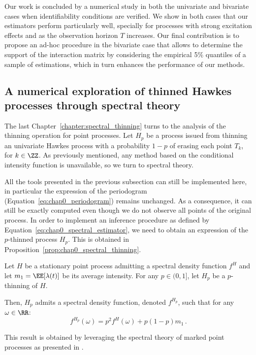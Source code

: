     Our work is concluded by a numerical study in both the univariate and bivariate cases when identifiability conditions are verified.
    We show in both cases that our estimators perform particularly well, specially for processes with strong excitation effects and as the observation horizon $T$ increases.
    Our final contribution is to propose an ad-hoc procedure in the bivariate case that allows to determine the support of the interaction matrix by considering the empirical 5$\%$ quantiles of a sample of estimations, which in turn enhances the performance of our methods.
    




    \subsection{A numerical exploration of thinned Hawkes processes through spectral theory}
    The last Chapter~\ref{chapter:spectral_thinning} turns to the analysis of the thinning operation for point processes.
    Let $H_p$ be a process issued from thinning an univariate Hawkes process with a probability $1-p$ of erasing each point $T_k$, for $k\in\ZZ$.
    As previously mentioned, any method based on the conditional intensity function is unavailable, so we turn to spectral theory.

    All the tools presented in the previous subsection can still be implemented here, in particular the expression of the periodogram (Equation~\eqref{eq:chap0_periodogram}) remains unchanged. 
    As a consequence, it can still be exactly computed even though we do not observe all points of the original process.
    In order to implement an inference procedure as defined by Equation~\eqref{eq:chap0_spectral_estimator}, we need to obtain an expression of the $p$-thinned process $H_p$.
    This is obtained in Proposition~\ref{prop:chap0_spectral_thinning}.

    \begin{proposition}\label{prop:chap0_spectral_thinning}
      Let $H$ be a stationary point process admitting a spectral density function $f^H$ and let $m_1=\EE[\lambda(t)]$ be its average intensity.
      For any $p\in(0,1]$, let $H_p$ be a $p$-thinning of $H$.
  
      Then, $H_p$ admits a spectral density function, denoted $f^{H_p}$, such that for any $\omega\in\RR$:
      \begin{equation}\label{eq:chap0_spectral_thinning}
          f^{H_p}(\omega) = p^2 f^H(\omega) + p(1-p)m_1\,.
      \end{equation}
  
  \end{proposition}
    This result is obtained by leveraging the spectral theory of marked point processes as presented in \textcite{Bremaud2005}.

